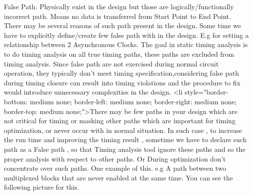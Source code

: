 False Path:
Physically exist in the design but those are logically/functionally incorrect path. Means no data is transferred from Start Point to End Point. There may be several reasons of such path present in the design.
Some time we have to explicitly define/create few false path with in the design. E.g for setting a relationship between 2 Asynchronous Clocks. 
The goal in static timing analysis is to do timing analysis on all true timing paths, these paths are excluded from timing analysis. 
Since false path are not exercised during normal circuit operation, they typically don't meet timing specification,considering false path during timing closure can result into timing violations and the procedure to fix would introduce unnecessary complexities in the design.
<li style="border-bottom: medium none; border-left: medium none; border-right: medium none; border-top: medium none;">There may be few paths in your design which are not critical for timing or masking other paths which are important for timing optimization, or never occur with in normal situation. In such case , to increase the run time and improving the timing result , sometime we have to declare such path as a False path , so that Timing analysis tool ignore these paths and so the proper analysis with respect to other paths. Or During optimization don't concentrate over such paths. One example of this. e.g A path between two multiplexed blocks that are never enabled at the same time. You can see the following picture for this.

